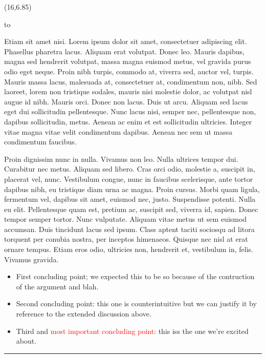 \documentclass[a0]{a0poster}
\def\Head#1{
  \noindent\hbox to \hsize{\hfil{\LARGE\color{DarkBlue}\sf #1}}\bigskip}
\begin{document}
  \begin{textblock}{7}(16,6.85)

  \Head{Discussion and Conclusions}

  \sf
  Etiam sit amet nisi. Lorem ipsum dolor sit amet, consectetuer adipiscing elit.
  Phasellus pharetra lacus. Aliquam erat volutpat. Donec leo. Mauris dapibus,
  magna sed hendrerit volutpat, massa magna euismod metus, vel gravida purus
  odio eget neque. Proin nibh turpis, commodo at, viverra sed, auctor vel,
  turpis. Mauris massa lacus, malesuada at, consectetuer at, condimentum non,
  nibh. Sed laoreet, lorem non tristique sodales, mauris nisi molestie dolor,
  ac volutpat nisl augue id nibh. Mauris orci. Donec non lacus. Duis ut arcu.
  Aliquam sed lacus eget dui sollicitudin pellentesque. Nunc lacus nisi, semper
  nec, pellentesque non, dapibus sollicitudin, metus. Aenean ac enim et est
  sollicitudin ultricies. Integer vitae magna vitae velit condimentum dapibus.
  Aenean nec sem ut massa condimentum faucibus. 

  Proin dignissim nunc in nulla. Vivamus non leo. Nulla ultrices tempor dui.
  Curabitur nec metus. Aliquam sed libero. Cras orci odio, molestie a, suscipit
  in, placerat vel, nunc. Vestibulum congue, nunc in faucibus scelerisque, ante
  tortor dapibus nibh, eu tristique diam urna ac magna. Proin cursus. Morbi
  quam ligula, fermentum vel, dapibus sit amet, euismod nec, justo. Suspendisse
  potenti. Nulla eu elit. Pellentesque quam est, pretium ac, suscipit sed,
  viverra id, sapien.
  Donec tempor semper tortor. Nunc vulputate. Aliquam vitae metus ut sem
  euismod accumsan. Duis tincidunt lacus sed ipsum. Class aptent taciti
  sociosqu ad litora torquent per conubia nostra, per inceptos himenaeos.
  Quisque nec nisl at erat ornare tempus. Etiam eros odio, ultricies non,
  hendrerit et, vestibulum in, felis. Vivamus gravida. 

  \begin{itemize}
    \item First concluding point; we expected this to be so because of the
      contruction of the argument and blah. 
    \item Second concluding point: this one is counterintuitive but we can
      justify it by reference to the extended discussion above.
    \item Third and \textcolor{Red}{most important concluding point}: this iss
       the one we're excited about.
  \end{itemize}

  \vspace*{4mm} %
  \bigskip
  \hrule
  \end{textblock}
\end{document}
